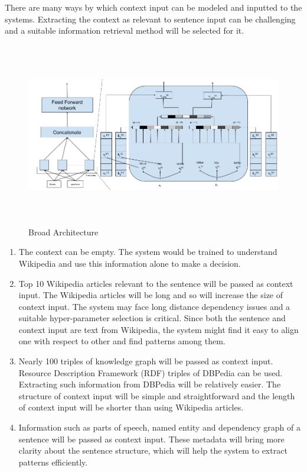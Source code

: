\documentclass[a4paper, 11pt]{article}
\begin{document}
There are many ways by which context input can be modeled and inputted to the systems. \color{red}Extracting the context as relevant to sentence input can be challenging and a suitable information retrieval method will be selected for it.\color{black}

\begin{figure}[htpb]
    \centering
    \includegraphics[width=\textwidth,height=8cm,keepaspectratio=true]
    {multi-head-attention.png}
    \caption{
        Broad Architecture
    }
    \label{fig:broad_architecture}
\end{figure}

\begin{enumerate}
\item The context can be empty. The system would be trained to understand Wikipedia and use this information alone to make a decision.
\item Top 10 Wikipedia articles relevant to the sentence will be passed as context input. The Wikipedia articles will be long and so will increase the size of context input. The system may face long distance dependency issues and a suitable hyper-parameter selection is critical. Since both the sentence and context input are text from Wikipedia, the system might find it easy to align one with respect to other and find patterns among them. 
\item Nearly 100 triples of knowledge graph will be passed as context input. Resource Description Framework (RDF) triples of DBPedia can be used. Extracting such information from DBPedia will be relatively easier. The structure of context input will be simple and straightforward and the length of context input will be shorter than using Wikipedia articles.  
\item Information such as parts of speech, named entity and dependency graph of a sentence will be passed as context input. These metadata will bring more clarity about the sentence structure, which will help the system to extract patterns efficiently. 
\end{enumerate}
\end{document}
